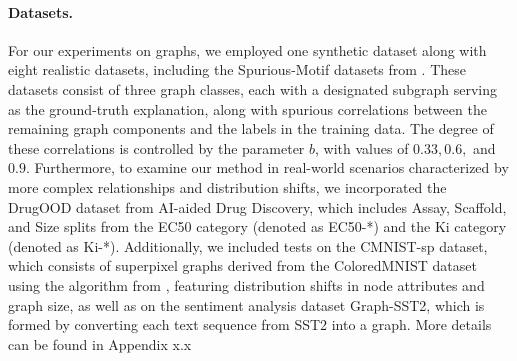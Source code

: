 \paragraph{Datasets.} For our experiments on graphs, we employed one synthetic dataset along with eight realistic datasets, including the Spurious-Motif datasets from \cite{dir}. These datasets consist of three graph classes, each with a designated subgraph serving as the ground-truth explanation, along with spurious correlations between the remaining graph components and the labels in the training data. The degree of these correlations is controlled by the parameter \( b \), with values of \( 0.33, 0.6, \) and \( 0.9 \). Furthermore, to examine our method in real-world scenarios characterized by more complex relationships and distribution shifts, we incorporated the DrugOOD dataset from AI-aided Drug Discovery, which includes Assay, Scaffold, and Size splits from the EC50 category (denoted as EC50-*) and the Ki category (denoted as Ki-*). Additionally, we included tests on the CMNIST-sp dataset, which consists of superpixel graphs derived from the ColoredMNIST dataset using the algorithm from \cite{understand_att}, featuring distribution shifts in node attributes and graph size, as well as on the sentiment analysis dataset Graph-SST2, which is formed by converting each text sequence from SST2 into a graph. More details can be found in Appendix x.x



